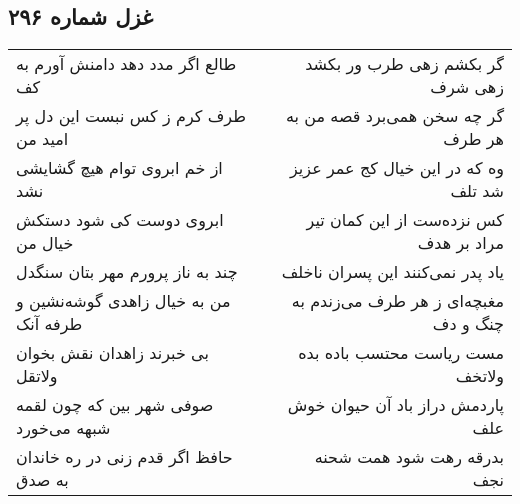 \begin{center}
\section*{غزل شماره ۲۹۶}
\label{sec:sh296}
\begin{longtable}{l p{0.5cm} r}
طالع اگر مدد دهد دامنش آورم به کف
&&
گر بکشم زهی طرب ور بکشد زهی شرف
\\
طرف کرم ز کس نبست این دل پر امید من
&&
گر چه سخن همی‌برد قصه من به هر طرف
\\
از خم ابروی توام هیچ گشایشی نشد
&&
وه که در این خیال کج عمر عزیز شد تلف
\\
ابروی دوست کی شود دستکش خیال من
&&
کس نزده‌ست از این کمان تیر مراد بر هدف
\\
چند به ناز پرورم مهر بتان سنگدل
&&
یاد پدر نمی‌کنند این پسران ناخلف
\\
من به خیال زاهدی گوشه‌نشین و طرفه آنک
&&
مغبچه‌ای ز هر طرف می‌زندم به چنگ و دف
\\
بی خبرند زاهدان نقش بخوان ولاتقل
&&
مست ریاست محتسب باده بده ولاتخف
\\
صوفی شهر بین که چون لقمه شبهه می‌خورد
&&
پاردمش دراز باد آن حیوان خوش علف
\\
حافظ اگر قدم زنی در ره خاندان به صدق
&&
بدرقه رهت شود همت شحنه نجف
\\
\end{longtable}
\end{center}
